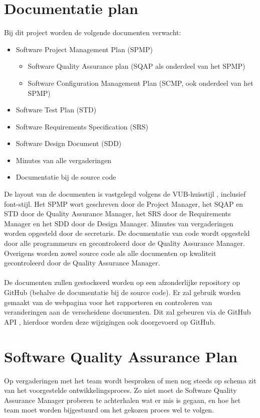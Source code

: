 \section{Documentatie plan} \label{sec:DocumentationPlan} %
Bij dit project worden de volgende documenten verwacht:
\begin{itemize}
	\item Software Project Management Plan (SPMP)
	    \begin{itemize}
	        \item Software Quality Assurance plan (SQAP als onderdeel van het SPMP)
	        \item Software Configuration Management Plan (SCMP, ook onderdeel van het SPMP)
	    \end{itemize}
	\item Software Test Plan (STD)
	\item Software Requirements Specification (SRS)
	\item Software Design Document (SDD)
	\item Minutes van alle vergaderingen
	\item Documentatie bij de source code
\end{itemize}
De layout van de documenten is vastgelegd volgens de VUB-huisstijl \cite{VUBHuisstijl}, inclusief font-stijl. Het SPMP wort geschreven door de Project Manager, het SQAP en STD door de Quality Assurance Manager, het SRS door de Requirements Manager en het SDD door de Design Manager. Minutes van vergaderingen worden opgesteld door de secretaris. De documentatie van code wordt opgesteld door alle programmeurs en gecontroleerd door de Quality Assurance Manager. Overigens worden zowel source code als alle documenten op kwaliteit gecontroleerd door de Quality Assurance Manager. 
\\
\\
De documenten zullen gestockeerd worden op een afzonderlijke repository op GitHub (behalve de documentatie bij de source code). Er zal gebruik worden gemaakt van de webpagina \cite{portalWebsite} voor het rapporteren en controleren van veranderingen aan de verscheidene documenten. Dit zal gebeuren via de GitHub API \cite{GitHubAPI}, hierdoor worden deze wijzigingen ook doorgevoerd op GitHub.

\section{Software Quality Assurance Plan}
Op vergaderingen met het team wordt besproken of men nog steeds op schema zit van het voorgestelde ontwikkelingsproces. Zo niet moet de Software Quality Assurance Manager proberen te achterhalen wat er mis is gegaan, en hoe het team moet worden bijgestuurd om het gekozen proces wel te volgen.

